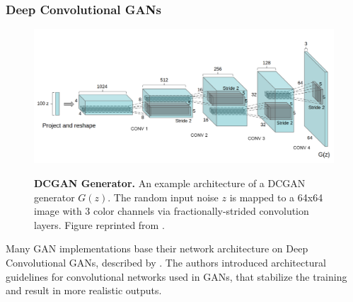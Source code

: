\documentclass{article}
\begin{document}
\subsubsection{Deep Convolutional GANs} \label{sec:dcgan}

\begin{figure}[h]
\centering
{\includegraphics[width=\linewidth]{GAN/dcgan_generator}}
\caption{\label{fig:dcgan} \textbf{DCGAN Generator.} An example architecture of a DCGAN generator $G(z)$. The random input noise $z$ is mapped to a 64x64 image with 3 color channels via fractionally-strided convolution layers. Figure reprinted from \cite{radford_unsupervised_2015}.}
\end{figure}

Many GAN implementations base their network architecture on Deep Convolutional GANs, described by \cite{radford_unsupervised_2015}. The authors introduced architectural guidelines for convolutional networks used in GANs, that stabilize the training and result in more realistic outputs.
\end{document}
